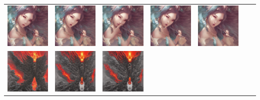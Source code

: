 \begin{table}[!htb]
\begin{tabular}{c c@{}c@{}c@{}c@{}c@{}c}
    \includegraphics[width=0.135\linewidth]{chapter/appendix/def_imgs/fairy/f_20.png} &
    \includegraphics[width=0.135\linewidth]{chapter/appendix/def_imgs/fairy/f_30.png} &
    \includegraphics[width=0.135\linewidth]{chapter/appendix/def_imgs/fairy/f_40.png} &
    \includegraphics[width=0.135\linewidth]{chapter/appendix/def_imgs/fairy/f_50.png} &
    \includegraphics[width=0.135\linewidth]{chapter/appendix/def_imgs/fairy/f_60.png} \\
    \includegraphics[width=0.135\linewidth]{chapter/appendix/def_imgs/phoenix/p_0.png} & 
    \includegraphics[width=0.135\linewidth]{chapter/appendix/def_imgs/phoenix/p_10.png} &
    \includegraphics[width=0.135\linewidth]{chapter/appendix/def_imgs/phoenix/p_20.png} &

\end{tabular}
\end{table}
